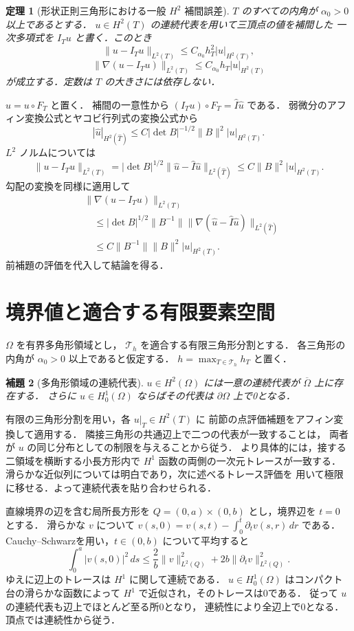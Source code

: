 \documentclass[a5paper,10pt,onecolumn]{jsarticle}
\makeatletter
\theoremstyle{mathnotetheorem}
\newtheorem{theorem}{定理}[section]
\newtheorem{lemma}[theorem]{補題}
\renewcommand{\proofname}{証明}
\renewenvironment{proof}[1][\proofname]{%
  \par\pushQED{\qed}\normalfont\topsep4\p@\@plus2\p@\relax
  \trivlist\item[\hskip\labelsep\bfseries #1]\ignorespaces
}{\popQED\endtrivlist\@endpefalse}
\newcommand{\norm}[1]{\lVert #1\rVert}
\makeatother
\begin{document}
\begin{theorem}[形状正則三角形における一般 $H^2$ 補間誤差]
$T$ のすべての内角が $\alpha_0>0$ 以上であるとする．
$u\in H^2(T)$ の連続代表を用いて三頂点の値を補間した
一次多項式を $I_Tu$ と書く．このとき
\[
 \norm{u-I_Tu}_{L^2(T)}\le C_{\alpha_0}h_T^2|u|_{H^2(T)},
\]
\[
 \norm{\nabla(u-I_Tu)}_{L^2(T)}
 \le C_{\alpha_0}h_T|u|_{H^2(T)}
\]
が成立する．定数は $T$ の大きさには依存しない．
\end{theorem}
\begin{proof}
$\widehat u=u\circ F_T$ と置く．
補間の一意性から
$(I_Tu)\circ F_T=\widehat I\widehat u$ である．
弱微分のアフィン変換公式とヤコビ行列式の変換公式から
\[
 |\widehat u|_{H^2(\widehat T)}
 \le C|\det B|^{-1/2}\norm B^2|u|_{H^2(T)}.
\]
$L^2$ ノルムについては
\[
 \norm{u-I_Tu}_{L^2(T)}
 =|\det B|^{1/2}
  \norm{\widehat u-\widehat I\widehat u}_{L^2(\widehat T)}
 \le C\norm B^2|u|_{H^2(T)}.
\]
勾配の変換を同様に適用して
\[
 \begin{aligned}
 &\norm{\nabla(u-I_Tu)}_{L^2(T)}\\
 &\quad\le|\det B|^{1/2}\norm{B^{-1}}
  \norm{\nabla(\widehat u-\widehat I\widehat u)}_{L^2(\widehat T)}\\
 &\quad\le C\norm{B^{-1}}\norm B^2|u|_{H^2(T)}.
 \end{aligned}
\]
前補題の評価を代入して結論を得る．
\end{proof}

\section{境界値と適合する有限要素空間}
$\Omega$ を有界多角形領域とし，
$\mathcal T_h$ を適合する有限三角形分割とする．
各三角形の内角が $\alpha_0>0$ 以上であると仮定する．
$h=\max_{T\in\mathcal T_h}h_T$ と置く．

\begin{lemma}[多角形領域の連続代表]
$u\in H^2(\Omega)$ には一意の連続代表が
$\overline\Omega$ 上に存在する．
さらに $u\in H_0^1(\Omega)$ ならばその代表は
$\partial\Omega$ 上で0となる．
\end{lemma}
\begin{proof}
有限の三角形分割を用い，各 $u|_T\in H^2(T)$ に
前節の点評価補題をアフィン変換して適用する．
隣接三角形の共通辺上で二つの代表が一致することは，
両者が $u$ の同じ分布としての制限を与えることから従う．
より具体的には，接する二領域を横断する小長方形内で
$H^1$ 函数の両側の一次元トレースが一致する．
滑らかな近似列については明白であり，次に述べるトレース評価を
用いて極限に移せる．よって連続代表を貼り合わせられる．

直線境界の辺を含む局所長方形を
$Q=(0,a)\times(0,b)$ とし，境界辺を $t=0$ とする．
滑らかな $v$ について
$v(s,0)=v(s,t)-\int_0^t\partial_tv(s,r)\,dr$ である．
Cauchy--Schwarzを用い，$t\in(0,b)$ について平均すると
\[
 \int_0^a|v(s,0)|^2\,ds
 \le\frac2b\norm v_{L^2(Q)}^2
     +2b\norm{\partial_tv}_{L^2(Q)}^2.
\]
ゆえに辺上のトレースは $H^1$ に関して連続である．
$u\in H_0^1(\Omega)$ はコンパクト台の滑らかな函数によって
$H^1$ で近似され，そのトレースは0である．
従って $u$ の連続代表も辺上でほとんど至る所0となり，
連続性により全辺上で0となる．頂点では連続性から従う．
\end{proof}
\end{document}
